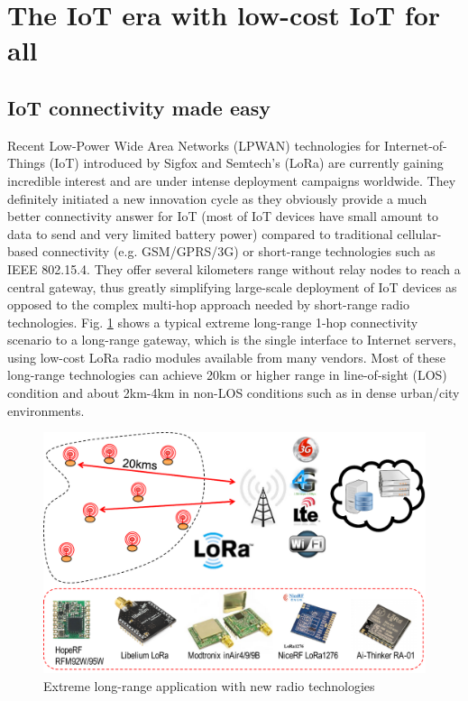 \section{The IoT era with low-cost IoT for all}

\subsection{IoT connectivity made easy}

Recent Low-Power Wide Area Networks (LPWAN) technologies for Internet-of-Things (IoT) introduced by Sigfox and Semtech's (LoRa\texttrademark) are currently gaining incredible interest and are under intense deployment campaigns worldwide. They definitely initiated a new innovation cycle as they obviously provide a much better connectivity answer for IoT (most of IoT devices have small amount to data to send and very limited battery power) compared to traditional cellular-based connectivity (e.g. GSM/GPRS/3G) or short-range technologies such as IEEE 802.15.4. They offer several kilometers range without relay nodes to reach a central gateway, thus greatly simplifying large-scale deployment of IoT devices as opposed to the complex multi-hop approach needed by short-range radio technologies. Fig. \ref{figure-1hop} shows a typical extreme long-range 1-hop connectivity scenario to a long-range gateway, which is the single interface to Internet servers, using low-cost LoRa radio modules available from many vendors. Most of these long-range technologies can achieve 20km or higher range in line-of-sight (LOS) condition and about 2km-4km in non-LOS conditions \cite{semtech-test,Libelium-lora-web} such as in dense urban/city environments.

\begin{figure}[htb]  
\centering  
\includegraphics[width=.6\linewidth]{figures/1-hop}   
\caption{Extreme long-range application with new radio technologies}   
\label{figure-1hop}  
\end{figure} 

